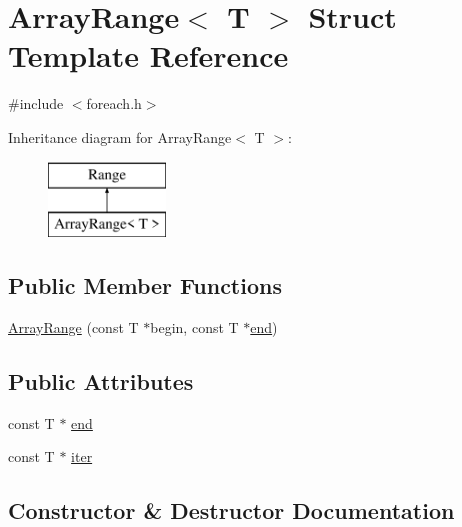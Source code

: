 \hypertarget{struct__fe_1_1ArrayRange}{}\section{Array\+Range$<$ T $>$ Struct Template Reference}
\label{struct__fe_1_1ArrayRange}


{\ttfamily \#include $<$foreach.\+h$>$}

Inheritance diagram for Array\+Range$<$ T $>$\+:\begin{figure}[H]
\begin{center}
\leavevmode
\includegraphics[height=2.000000cm]{struct__fe_1_1ArrayRange}
\end{center}
\end{figure}
\subsection*{Public Member Functions}
\begin{DoxyCompactItemize}
\item 
\mbox{\hyperlink{struct__fe_1_1ArrayRange_ae90cf27de0472ad0005c903ea89c32bf}{Array\+Range}} (const T $\ast$begin, const T $\ast$\mbox{\hyperlink{struct__fe_1_1ArrayRange_a31445d336333d06df9119b914833c8c1}{end}})
\end{DoxyCompactItemize}
\subsection*{Public Attributes}
\begin{DoxyCompactItemize}
\item 
const T $\ast$ \mbox{\hyperlink{struct__fe_1_1ArrayRange_a31445d336333d06df9119b914833c8c1}{end}}
\item 
const T $\ast$ \mbox{\hyperlink{struct__fe_1_1ArrayRange_aa839e62a03ecd06c3f3fe0e92181d555}{iter}}
\end{DoxyCompactItemize}


\subsection{Constructor \& Destructor Documentation}
\mbox{\label{struct__fe_1_1ArrayRange_ae90cf27de0472ad0005c903ea89c32bf}} 
